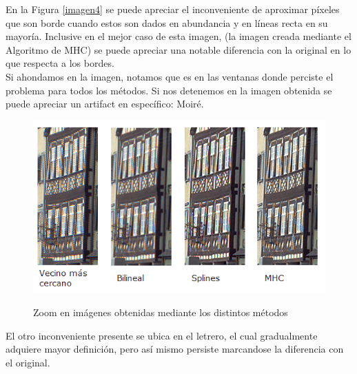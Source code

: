 \documentclass[a4paper]{article}
\begin{document}
En la Figura \ref{imagen4} se puede apreciar el inconveniente de aproximar p\'ixeles que son borde cuando estos son dados en abundancia y en l\'ineas recta en su mayor\'ia. Inclusive en el mejor caso de esta imagen, (la imagen creada mediante el Algoritmo de MHC) se puede apreciar una notable diferencia con la original en lo que respecta a los bordes.\\

Si ahondamos en la imagen, notamos que es en las ventanas donde perciste el problema para todos los métodos. Si nos detenemos en la imagen obtenida se puede apreciar un artifact en específico: Moir\'e. \\

\begin{figure}[h!]
    \caption{Zoom en imágenes obtenidas mediante los distintos métodos}
    \begin{center}
    \includegraphics[scale=1]{imagenes/comparacion/04/ventanitas}
    \label{ventanitas}
  \end{center}
\end{figure}

El otro inconveniente presente se ubica en el letrero, el cual gradualmente adquiere mayor definici\'on, pero as\'i mismo persiste marcandose la diferencia con el original. \\
\end{document}
